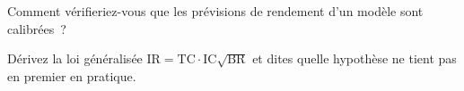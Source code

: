 \begin{interviewq}\label{iq:rs:from-signal-to-forecast:5}
Comment vérifieriez-vous que les prévisions de rendement d'un modèle sont calibrées~?
\end{interviewq}

\begin{interviewq}\label{iq:rs:from-signal-to-forecast:6}
Dérivez la loi généralisée $\mathrm{IR} = \mathrm{TC}\cdot\mathrm{IC}\sqrt{\mathrm{BR}}$ et dites quelle hypothèse ne tient pas en premier en pratique.
\end{interviewq}
